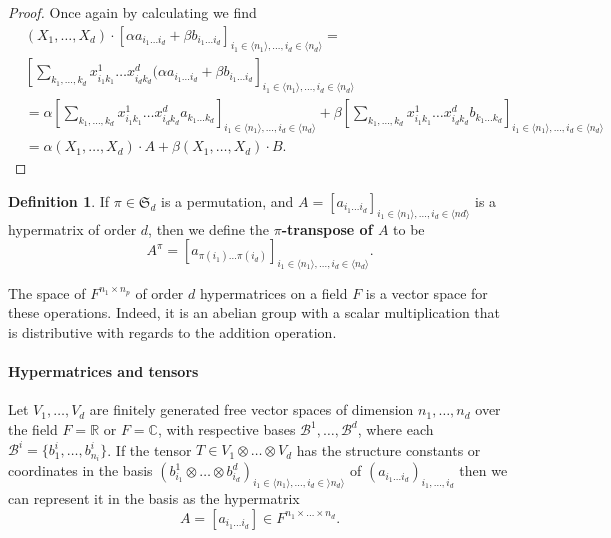 \documentclass{report}
\theoremstyle{definition}
\newtheorem{defin}{Definition}
\theoremstyle{remark}
\begin{document}
\begin{proof}
    Once again by calculating we find
    \begin{equation*}
        \begin{split}
            & (X_1, \dots , X_d) \cdot [\alpha a_{i_1 \dots i_d} + \beta b_{i_1 \dots i_d}]_{i_1 \in \langle n_1 \rangle, \dots , i_d \in \langle n_d \rangle} = \\
            & \left[ \sum_{k_1 , \dots , k_d} x^1_{i_1 k_1} \dots x^d_{i_d k_d} (\alpha a_{i_1 \dots i_d} + \beta b_{i_1 \dots i_d}\right]_{i_1 \in \langle n_1 \rangle, \dots , i_d \in \langle n_d \rangle} \\
            & = \alpha \left[ \sum_{k_1 , \dots ,k_d} x^1_{i_1 k_1} \dots x^d_{i_d k_d} a_{k_1 \dots k_d} \right]_{i_1 \in \langle n_1 \rangle, \dots , i_d \in \langle n_d \rangle} + \beta \left[ \sum_{k_1, \dots , k_d}x^1_{i_1 k_1} \dots x^d_{i_d k_d} b_{k_1 \dots k_d} \right]_{i_1 \in \langle n_1 \rangle, \dots , i_d \in \langle n_d \rangle} \\
            & = \alpha (X_1, \dots, X_d) \cdot A + \beta (X_1, \dots, X_d) \cdot B. 
        \end{split}
    \end{equation*}
\end{proof}


\begin{defin}
        If $\pi \in \mathfrak{S}_d$ is a permutation, and $A = [a_{i_1 \dots i_d}]_{i_1 \in\langle n_1 \rangle,\dots,i_d \in\langle nd \rangle}$ is a hypermatrix of order $d$, then we define the \textbf{$\pi$-transpose of $A$} to be
        \begin{equation*}
                A^\pi = [a_{\pi(i_1)\dots\pi(i_d)}]_{i_1 \in \langle n_1 \rangle,\dots,i_d \in \langle n_d \rangle}.
        \end{equation*}

\end{defin}



The space of $F^{n_1 \times n_p}$ of order $d$ hypermatrices on a field $F$ is a vector space for these operations. Indeed, it is an abelian group with a scalar multiplication that is distributive with regards to the addition operation.


\paragraph{Hypermatrices and tensors}
Let $V_1, \dots, V_d$ are finitely generated free vector spaces of dimension $n_1, \dots, n_d$ over the field $F = \mathbb{R}$ or $F = \mathbb{C}$, with respective bases $\mathcal{B}^1, \dots, \mathcal{B}^d$, where each $\mathcal{B}^i = \{b_1^i, \dots, b_{n_i}^i\}$.
If the tensor $T \in V_1 \otimes \dots \otimes V_d$ has the structure constants or coordinates in the basis $(b^1_{i_1} \otimes \dots \otimes b^d_{i_d})_{i_1 \in \langle n_1 \rangle, \dots , i_d \in \rangle n_d \rangle}$ of $(a_{i_1 \dots i_d})_{i_1 , \dots , i_d}$ then we can represent it in the basis as the hypermatrix
\begin{equation*}
    A = [a_{i_1 \dots i_d}]\in F^{n_1 \times \dots \times n_d}.
\end{equation*}
\end{document}
